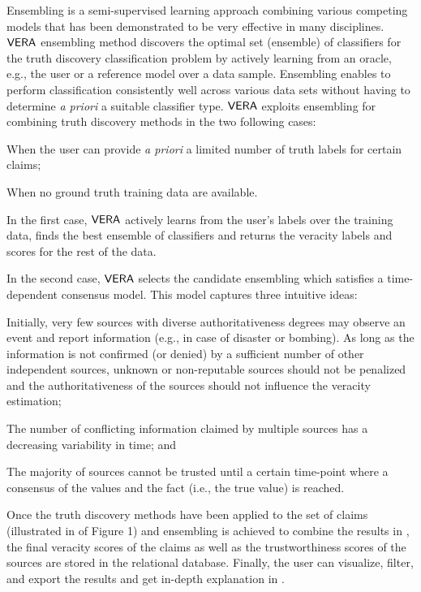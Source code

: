 \label{ensembling} Ensembling is a semi-supervised learning approach  combining various competing models that has been demonstrated to be very effective in many disciplines.%
$\mathsf{VERA}$ ensembling method discovers the optimal set (ensemble) of classifiers for the truth discovery classification problem by actively learning from an oracle, e.g., the user or a reference model over a data sample. Ensembling  enables to perform
classification consistently well across various data sets without having to determine \emph{a priori} a suitable classifier 
type.  $\mathsf{VERA}$ exploits ensembling for combining truth discovery methods in the two following cases:
\begin{inparaenum}[(1)]
\item  When the user can provide  \emph{a priori} a limited number of truth labels for certain claims; 
\item When no ground truth training data are available.
\end{inparaenum}

In the first case, $\mathsf{VERA}$  actively learns from the user's labels over the training data, finds the best ensemble of classifiers and returns the veracity labels and scores for the rest of the data. 

In the second case, $\mathsf{VERA}$ selects the candidate ensembling which satisfies a time-dependent consensus model. This model captures three intuitive ideas: 
\begin{inparaenum}[(i)]
\item Initially, very few sources with diverse authoritativeness degrees may observe an event and report information  (e.g., in case of disaster or  bombing). As long as the information is  not confirmed (or denied)  by a sufficient number of other independent sources, unknown or non-reputable  sources should not be penalized and the authoritativeness of the sources should not influence the veracity estimation;
\item The number of conflicting information claimed by multiple sources has a decreasing variability in time; and
\item  The majority of sources cannot be trusted until a certain time-point where a consensus of the values and the fact (i.e., the true value) is reached.
\end{inparaenum}

Once the  truth discovery methods have been applied to the set of claims (illustrated in  of Figure 1) and  ensembling is  achieved to combine the results  in , the final veracity scores of the claims as well as the trustworthiness scores of the sources are stored in the relational database. Finally, the user  can  visualize, filter,  and export  the results and get in-depth explanation in .

